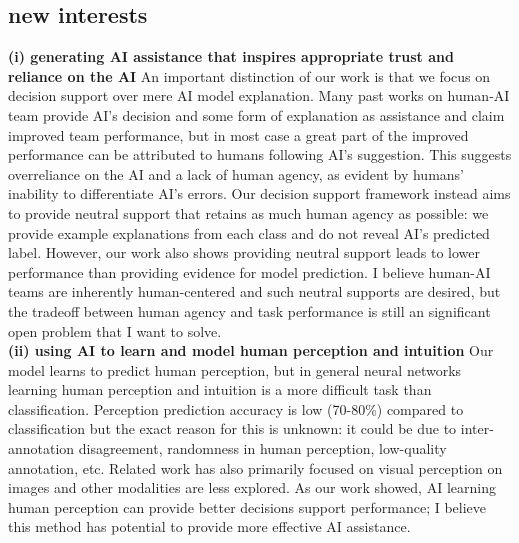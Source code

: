\subsection{new interests}

\textbf{(i) generating AI assistance that inspires appropriate trust and reliance on the AI} An important distinction of our work is that we focus on decision support over mere AI model explanation. Many past works on human-AI team provide AI's decision and some form of explanation as assistance and claim improved team performance, but in most case a great part of the improved performance can be attributed to humans following AI's suggestion. This suggests overreliance on the AI and a lack of human agency, as evident by humans' inability to differentiate AI's errors. Our decision support framework instead aims to provide neutral support that retains as much human agency as possible: we provide example explanations from each class and do not reveal AI's predicted label. However, our work also shows providing neutral support leads to lower performance than providing evidence for model prediction. I believe human-AI teams are inherently human-centered and such neutral supports are desired, but the tradeoff between human agency and task performance is still an significant open problem that I want to solve. \\


\textbf{(ii) using AI to learn and model human perception and intuition} Our model learns to predict human perception, but in general neural networks learning human perception and intuition is a more difficult task than classification. Perception prediction accuracy is low (70-80\%) compared to classification but the exact reason for this is unknown: it could be due to inter-annotation disagreement, randomness in human perception, low-quality annotation, etc. Related work has also primarily focused on visual perception on images and other modalities are less explored. As our work showed, AI learning human perception can provide better decisions support performance; I believe this method has potential to provide more effective AI assistance.


